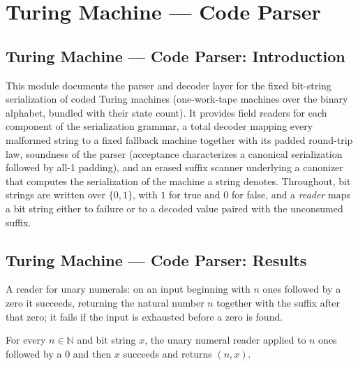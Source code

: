 \section{Turing Machine --- Code Parser}
\subsection*{Turing Machine --- Code Parser: Introduction}

This module documents the parser and decoder layer for the fixed bit-string
serialization of coded Turing machines (one-work-tape machines over the binary
alphabet, bundled with their state count).  It provides field readers for each
component of the serialization grammar, a total decoder mapping every malformed
string to a fixed fallback machine together with its padded round-trip law,
soundness of the parser (acceptance characterizes a canonical serialization
followed by all-1 padding), and an erased suffix scanner underlying a canonizer
that computes the serialization of the machine a string denotes.  Throughout,
bit strings are written over $\{0,1\}$, with $1$ for true and $0$ for false, and
a \emph{reader} maps a bit string either to failure or to a decoded value paired
with the unconsumed suffix.

\subsection*{Turing Machine --- Code Parser: Results}

\begin{definition}
\label{Turing.codeReadUnary}
\leanok
A reader for unary numerals: on an input beginning with $n$ ones followed by a
zero it succeeds, returning the natural number $n$ together with the suffix
after that zero; it fails if the input is exhausted before a zero is found.
\end{definition}

\begin{lemma}
\label{Turing.codeReadUnary_append}
\leanok
{}
For every $n\in\mathbb N$ and bit string $x$, the unary numeral reader applied to $n$
ones followed by a $0$ and then $x$ succeeds and returns $(n,x)$.
\end{lemma}

